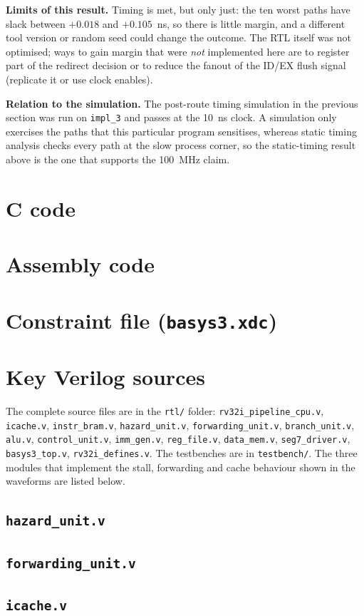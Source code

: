 \documentclass[11pt,a4paper]{article}
\begin{document}
\textbf{Limits of this result.} Timing is met, but only just: the ten worst paths have slack between $+0.018$ and $+0.105$~ns, so there is little margin, and a different tool version or random seed could change the outcome. The RTL itself was not optimised; ways to gain margin that were \emph{not} implemented here are to register part of the redirect decision or to reduce the fanout of the ID/EX flush signal (replicate it or use clock enables).

\textbf{Relation to the simulation.} The post-route timing simulation in the previous section was run on \texttt{impl\_3} and passes at the 10~ns clock. A simulation only exercises the paths that this particular program sensitises, whereas static timing analysis checks every path at the slow process corner, so the static-timing result above is the one that supports the 100~MHz claim.

\appendix
\section{C code}


\section{Assembly code}


\section{Constraint file (\texttt{basys3.xdc})}


\section{Key Verilog sources}
The complete source files are in the \texttt{rtl/} folder: \texttt{rv32i\_pipeline\_cpu.v}, \texttt{icache.v}, \texttt{instr\_bram.v}, \texttt{hazard\_unit.v}, \texttt{forwarding\_unit.v}, \texttt{branch\_unit.v}, \texttt{alu.v}, \texttt{control\_unit.v}, \texttt{imm\_gen.v}, \texttt{reg\_file.v}, \texttt{data\_mem.v}, \texttt{seg7\_driver.v}, \texttt{basys3\_top.v}, \texttt{rv32i\_defines.v}. The testbenches are in \texttt{testbench/}. The three modules that implement the stall, forwarding and cache behaviour shown in the waveforms are listed below.

\subsection*{\texttt{hazard\_unit.v}}


\subsection*{\texttt{forwarding\_unit.v}}


\subsection*{\texttt{icache.v}}

\end{document}
